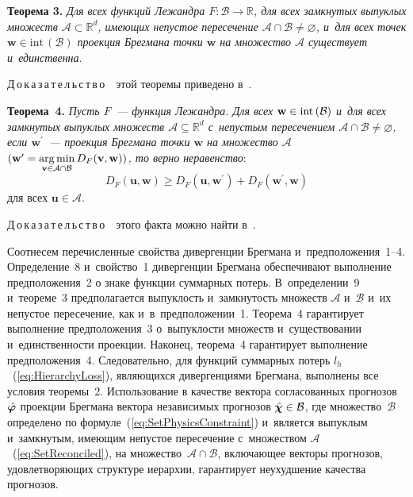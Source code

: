 \begin{multicols}{2}
\smallskip


\noindent
\textbf{Теорема 3.}
\textit{Для всех функций Лежандра $F \colon \mathcal{B} \to \mathbb{R}$, для всех замкнутых
выпуклых множеств $\mathcal{A} \subset \mathbb{R}^d$, имеющих непустое пересечение
$\mathcal{A} \cap \mathcal{B} \neq \varnothing$, и~для всех точек $\mathbf{w} \in
\mathrm{int}\,(\mathcal{B})$ проекция Брегмана точки $\mathbf{w}$ на множество
$\mathcal{A}$ существует и~единственна}.


\smallskip

\noindent
Д\,о\,к\,а\,з\,а\,т\,е\,л\,ь\,с\,т\,в\,о\ \ этой теоремы приведено в~\cite{bregman1967relaxation}.

\smallskip

\noindent
\textbf{Теорема~4.}
\textit{Пусть $F$~--- функция Лежандра. Для всех $\mathbf{w} \hm\in
\mathrm{int}\,(\mathcal{B})$ и~для всех замкнутых выпуклых множеств $\mathcal{A}
\subseteq \mathbb{R}^d$ с~непустым пересечением $\mathcal{A} \cap \mathcal{B} \neq
\varnothing$, если $\mathbf{w}^{\prime}$~--- проекция Брегмана
точки $\mathbf{w}$ на множество $\mathcal{A}$ $(\mathbf{w}^{\prime} \hm=
\argmin\limits_{\mathbf{v} \in \mathcal{A} \cap \mathcal{B}} D_F(\mathbf{v},
\mathbf{w}))$, то верно неравенство}:
$$
    D_F(\mathbf{u}, \mathbf{w}) \geq D_F(\mathbf{u},
    \mathbf{w}^{\prime}) + D_F(\mathbf{w}^{\prime}, \mathbf{w})
$$
для всех $\mathbf{u} \in \mathcal{A}$.

\noindent
Д\,о\,к\,а\,з\,а\,т\,е\,л\,ь\,с\,т\,в\,о\ \ этого факта можно найти в~\cite{cesa2006prediction}.

\smallskip

Соотнесем перечисленные свойства дивергенции Брегмана и~предположения~1--4. Определение~8 и~свойство~1 дивергенции Брегмана
обеспечивают выполнение предположения~2 о
знаке функции суммарных потерь. В~определении~9
и~тео\-ре\-ме~3 предполагается выпуклость и~замкнутость
множеств $\mathcal{A}$ и~$\mathcal{B}$ и~их непустое пересечение,
как и~в~предположении~1. Теорема~4 гарантирует
выполнение предположения~3 о~выпуклости
множеств и~существовании и~единственности проекции. Наконец,
теорема~4 гарантирует
выполнение предположения~4.
Следовательно, для функций суммарных потерь $l_h$~(\ref{eq:HierarchyLoss}),
являющихся дивергенциями Брегмана,
выполнены все условия теоремы~2. Использование
в качестве вектора согласованных прогнозов $\hat{\boldsymbol{\varphi}}$ проекции
Брегмана вектора независимых прогнозов $\hchi \hm\in \mathcal{B}$, где
множество~$\mathcal{B}$ определено по формуле~(\ref{eq:SetPhysicsConstraint}) и~является выпуклым и~замкнутым,
имеющим непустое пересечение
с~множеством $\mathcal{A}$~(\ref{eq:SetReconciled}),
на множество~$\mathcal{A}\cap \mathcal{B}$, включающее векторы
прогнозов, удовлетворяющих структуре иерархии, гарантирует
неухудшение качества прогнозов.


\end{multicols}
